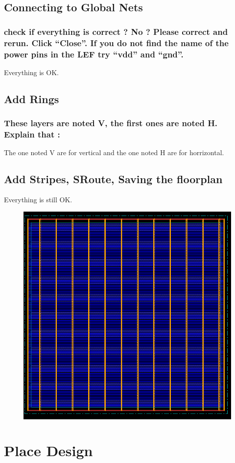 \documentclass[11pt,a4paper,sans,dvipsnames]{report}
\begin{document}
	\subsection*{Connecting to Global Nets}
	\subsubsection*{check if everything is correct ? No ? Please correct and rerun. Click “Close”. If you do not find the name of the power pins in the LEF try “vdd” and “gnd”.}
	Everything is OK.

	\subsection*{Add Rings}
	\subsubsection*{These layers are noted V, the first ones are noted H. Explain that :}
	The one noted V are for vertical and the one noted H are for horrizontal.

	\subsection*{Add Stripes, SRoute, Saving the floorplan}
	Everything is still OK.

	\begin{figure}[h!]
		\centering
		\includegraphics[width=0.50\linewidth, frame]{images/floorandpower_plan.png}
		\label{fig:floor_power_plan}
	\end{figure}

	\newpage
	\section{Place Design}
\end{document}
